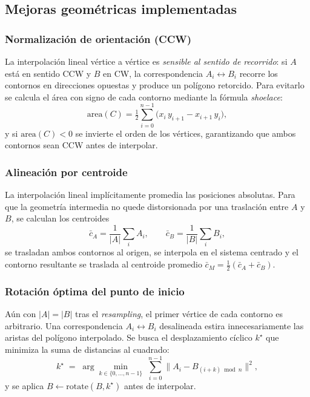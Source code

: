\documentclass[conference]{IEEEtran}
\begin{document}
\subsection{Mejoras geométricas implementadas}
\label{sec:resultados:mejoras}

\subsubsection{Normalización de orientación (CCW)}
\label{sec:resultados:mejoras:ccw}
La interpolación lineal vértice a vértice es
\emph{sensible al sentido de recorrido}: si $A$ está en
sentido CCW y $B$ en CW, la correspondencia $A_i
\leftrightarrow B_i$ recorre los contornos en direcciones
opuestas y produce un polígono retorcido. Para evitarlo se
calcula el área con signo de cada contorno mediante la
fórmula \emph{shoelace}:
\begin{equation}
  \mathrm{area}(C) =
  \tfrac{1}{2}\!\sum_{i=0}^{n-1}\!
  \bigl( x_i\, y_{i+1} - x_{i+1}\, y_i \bigr),
\end{equation}
y si $\mathrm{area}(C) < 0$ se invierte el orden de los
vértices, garantizando que ambos contornos sean CCW antes
de interpolar.

\subsubsection{Alineación por centroide}
\label{sec:resultados:mejoras:centroide}
La interpolación lineal implícitamente promedia las
posiciones absolutas. Para que la geometría intermedia no
quede distorsionada por una traslación entre $A$ y $B$, se
calculan los centroides
\begin{equation}
  \bar{c}_A = \frac{1}{|A|}\sum_{i} A_i,
  \qquad
  \bar{c}_B = \frac{1}{|B|}\sum_{i} B_i,
\end{equation}
se trasladan ambos contornos al origen, se interpola en el
sistema centrado y el contorno resultante se traslada al
centroide promedio $\bar{c}_M = \tfrac{1}{2}(\bar{c}_A +
\bar{c}_B)$.

\subsubsection{Rotación óptima del punto de inicio}
\label{sec:resultados:mejoras:rotacion}
Aún con $|A| = |B|$ tras el \textit{resampling}, el primer
vértice de cada contorno es arbitrario. Una correspondencia
$A_i \leftrightarrow B_i$ desalineada estira
innecesariamente las aristas del polígono interpolado. Se
busca el desplazamiento cíclico $k^{\star}$ que minimiza la
suma de distancias al cuadrado:
\begin{equation}
  k^{\star} \;=\; \arg\min_{k \in \{0,\dots,n-1\}}\;
  \sum_{i=0}^{n-1}
  \bigl\lVert A_i - B_{(i+k) \bmod n} \bigr\rVert^{2},
\end{equation}
y se aplica $B \leftarrow \mathrm{rotate}(B, k^{\star})$
antes de interpolar.
\end{document}
